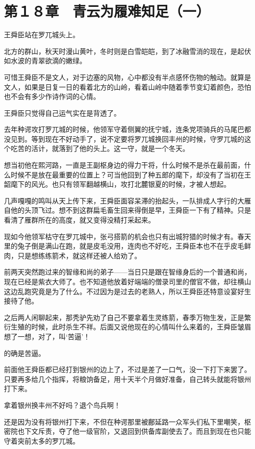 \section{第１８章　青云为履难知足（一）}

王舜臣站在罗兀城头上。

北方的群山，秋天时漫山黄叶，冬时则是白雪皑皑，到了冰融雪消的现在，是起伏如水波的青翠欲滴的嫩绿。

可惜王舜臣不是文人，对于边塞的风物，心中都没有半点感怀伤物的触动。就算是文人，如果是日复一日的看着北方的山岭，看着山岭中随着季节变幻着颜色，恐怕也不会有多少作诗作词的心情。

王舜臣只觉得自己运气实在是背透了。

去年种谔攻打罗兀城的时候，他领军守着侧翼的抚宁城，连条党项骑兵的马尾巴都没见到。等到现在不好动手了，说不定要将罗兀城换回丰州的时候，守罗兀城的这个吃苦的活计，就落到了他的头上。这一守，就是一个冬天。

想当初他在熙河路，一直是王副枢身边的得力干将，什么时候不是杀在最前面，什么时候不是放在最重要的位置上？可当他回到了种五郎的麾下，却没有了当初在王韶麾下的风光。也只有领军翻越横山，攻打北麓银夏的时候，才被人想起。

几声嘎嘎的鸣叫从天上传下来，王舜臣面容呆滞的抬起头，一队排成人字行的大雁自他的头顶飞过。想不到这群扁毛畜生回来得倒是早，王舜臣一下有了精神。只是看清了雁群所在的高度，就又变得没精打采起来。

现如今他领军枯守在罗兀城中，张弓搭箭的机会也只有出城狩猎的时候才有。春天里的兔子倒是满山在跑，就是皮毛没用，连肉也不好吃，王舜臣本也不在乎皮毛鲜肉，只是想练练箭术，就这样还被人给劝了。

前两天突然跑过来的智缘和尚的弟子——当日只是跟在智缘身后的一个普通和尚，现在已经是紫衣大师了。也不知道他放着好端端的僧录司里的僧官不做，却往横山这边乱跑究竟是为了什么。不过因为是过去的老熟人，所以王舜臣还特意设宴好生接待了他。

之后两人闲聊起来，那秃驴先劝了自己不要拿着生灵练箭，春季万物生发，正是繁衍生殖的时候，此时杀生不祥。后面又说他现在的心情叫什么来着的，王舜臣皱眉想了一想，对了，叫‘苦逼’！

的确是苦逼。

前面他王舜臣都已经打到银州的边上了，不过是差了一口气，没一下打下来罢了。只要再多给几个指挥，将粮饷备足，用十天半个月做好准备，自己转头就能将银州打下来。

拿着银州换丰州不好吗？退个鸟兵啊！

还是因为没有将银州打下来，不但在种谔那里被鄜延路一众军头们私下里嘲笑，枢密院也下文斥责，夺了他一级官阶，又退回到供备库副使去了。而且到现在也只能守着突前太多的罗兀城。

